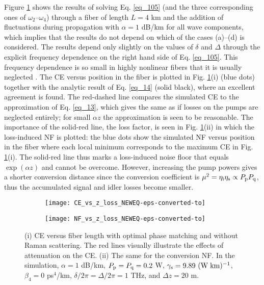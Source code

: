 \documentclass[10pt,letterpaper]{article}
\begin{document}
Figure \ref{fig_4} shows the results of solving Eq. \eqref{eq_105} (and the three corresponding ones of $\omega_2$--$\omega_4$) through a fiber of length $L = 4$ km and the addition of fluctuations during propagation with $\alpha = 1$ dB/km for all wave components, which implies that the results do not depend on which of the cases (a)--(d) is considered. The results depend only slightly on the values of $\delta$ and $\Delta$ through the explicit frequency dependence on the right hand side of Eq. \eqref{eq_105}. This frequency dependence is so small in highly nonlinear fibers that it is usually neglected \cite{Agrawal}. The CE versus position in the fiber is plotted in Fig. \ref{fig_4}(i) (blue dots) together with the analytic result of Eq. \eqref{eq_14} (solid black), where an excellent agreement is found. The red-dashed line compares the simulated CE to the approximation of Eq. \eqref{eq_13}, which gives the same as if losses on the pumps are neglected entirely; for small $\alpha z$ the approximation is seen to be reasonable. The importance of the solid-red line, the loss factor, is seen in Fig. \ref{fig_4}(ii) in which the loss-induced NF is plotted: the blue dots show the simulated NF versus position in the fiber where each local minimum corresponds to the maximum CE in Fig. \ref{fig_4}(i). The solid-red line thus marks a loss-induced noise floor that equals $\exp(\alpha z)$ and cannot be overcome. However, increasing the pump powers gives a shorter conversion distance since the conversion coefficient is $\mu^2 = \eta_{\rm i} \eta_{\rm s} \propto P_{\rm p}P_{\rm q}$, thus the accumulated signal and idler losses become smaller.

\begin{figure}[!t]
\centering \begin{subfigure}{0.49\linewidth}  \centering
\texttt{[image: CE\_vs\_z\_loss\_NEWEQ-eps-converted-to]}
\caption{}
\end{subfigure} %
\begin{subfigure}{0.49\linewidth}  \centering
\texttt{[image: NF\_vs\_z\_loss\_NEWEQ-eps-converted-to]}
\caption{}
\end{subfigure}\vspace{-0.25cm}
\caption{(i) CE versus fiber length with optimal phase matching and without Raman scattering. The red lines visually illustrate the effects of attenuation on the CE. (ii) The same for the conversion NF. In the simulation, $\alpha = 1$ dB/km, $P_{\rm p}=P_{\rm q} = 0.2$ W, $\gamma_{\rm s} = 9.89\ ({\rm W\;km})^{-1}$, $\beta_4 = 0$ ps$^4$/km, $\delta/2\pi = \Delta/2\pi= 1$ THz, and $\Delta z = 20$ m.} \label{fig_4}
\end{figure}
\end{document}
